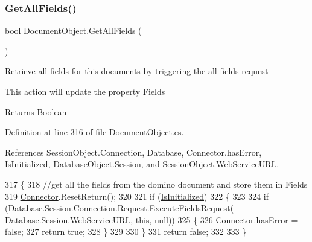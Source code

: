 \subsubsection{\texorpdfstring{Get\+All\+Fields()}{GetAllFields()}}
{\footnotesize\ttfamily bool Document\+Object.\+Get\+All\+Fields (\begin{DoxyParamCaption}{ }\end{DoxyParamCaption})}



Retrieve all fields for this documents by triggering the all fields request 

This action will update the property \textquotesingle{}Fields\textquotesingle{} 

\begin{DoxyReturn}{Returns}
Boolean
\end{DoxyReturn}


Definition at line 316 of file Document\+Object.\+cs.



References Session\+Object.\+Connection, Database, Connector.\+has\+Error, Is\+Initialized, Database\+Object.\+Session, and Session\+Object.\+Web\+Service\+U\+RL.


\begin{DoxyCode}
317     \{
318         \textcolor{comment}{//get all the fields from the domino document and store them in Fields}
319         \mbox{\hyperlink{class_connector}{Connector}}.ResetReturn();
320 
321         \textcolor{keywordflow}{if} (\mbox{\hyperlink{class_document_object_a3b2075b73f38d05091b69decc6ce7992}{IsInitialized}})
322         \{
323 
324             \textcolor{keywordflow}{if} (\mbox{\hyperlink{class_document_object_a69d5338c9835f748490323d2950eed09}{Database}}.\mbox{\hyperlink{class_database_object_aa8484162b7d2a7c4c9426bca13c64c07}{Session}}.\mbox{\hyperlink{class_session_object_a014bdbf705a753540e19bfb53030c55c}{Connection}}.Request.ExecuteFieldsRequest(
      \mbox{\hyperlink{class_document_object_a69d5338c9835f748490323d2950eed09}{Database}}.\mbox{\hyperlink{class_database_object_aa8484162b7d2a7c4c9426bca13c64c07}{Session}}.\mbox{\hyperlink{class_session_object_a697c071c812fbf7ad1166b896fb44c16}{WebServiceURL}}, \textcolor{keyword}{this}, null))
325             \{
326                 \mbox{\hyperlink{class_connector}{Connector}}.\mbox{\hyperlink{class_connector_a079bae21a5417efa53bfe8954c0f533f}{hasError}} = \textcolor{keyword}{false};
327                 \textcolor{keywordflow}{return} \textcolor{keyword}{true};
328             \}
329 
330         \}
331         \textcolor{keywordflow}{return} \textcolor{keyword}{false};
332 
333     \}
\end{DoxyCode}
\mbox{\label{class_document_object_a8883fec3b5b1b6e2e43f4b5ca4092684}} 
